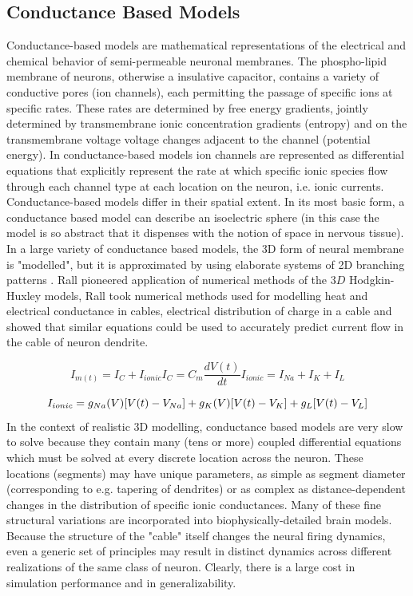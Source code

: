 \subsection{Conductance Based Models}
Conductance-based models are mathematical representations of the electrical and chemical behavior of semi-permeable neuronal membranes.
The phospho-lipid membrane of neurons, otherwise a insulative capacitor, contains a variety of conductive pores (ion channels), each permitting the passage of specific ions at specific rates.
These rates are determined by free energy gradients, jointly determined by transmembrane ionic concentration gradients (entropy) and on the transmembrane voltage voltage changes adjacent to the channel (potential energy).
In conductance-based models ion channels are represented as differential equations that explicitly represent the rate at which specific ionic species flow through each channel type at each location on the neuron, i.e. ionic currents.
Conductance-based models differ in their spatial extent. In its most basic form, a conductance based model can describe an isoelectric sphere (in this case the model is so abstract that it dispenses with the notion of space in nervous tissue).
In a large variety of conductance based models, the 3D form of neural membrane is "modelled", but it is approximated by using elaborate systems of 2D branching patterns \cite{rall1962electrophysiology}.
Rall pioneered application of numerical methods of the $3D$ Hodgkin-Huxley models, Rall took numerical methods used for modelling heat and electrical conductance in cables, electrical distribution of charge in a cable and showed that similar equations could be used to accurately predict current flow in the cable of neuron dendrite.
\\
\begin{center}
\begin{equation}
I_{m(t)}=I_{C}+I_{ionic} 
I_{C}=C_{m}\frac{dV(t)}{dt} 
I_{ionic}=I_{Na}+I_{K}+I_{L}
\end{equation}
\end{center}
\begin{equation}
I_{ionic}=\\
g_{Na}(V)[V(t)-V_{Na}]+\\
g_{K}(V)[V(t)-V_{K}]+\\g_{L}[V(t)-V_{L}] 
\end{equation}
In the context of realistic 3D modelling, conductance based models are very slow to solve because they contain many (tens or more) coupled differential equations which must be solved at every discrete location across the neuron.
These locations (segments) may have unique parameters, as simple as segment diameter (corresponding to e.g. tapering of dendrites) or as complex as distance-dependent changes in the distribution of specific ionic conductances.
Many of these fine structural variations are incorporated into biophysically-detailed brain models.  
Because the structure of the "cable" itself changes the neural firing dynamics, even a generic set of principles may result in distinct dynamics across different realizations of the same class of neuron.  
Clearly, there is a large cost in simulation performance and in generalizability.

